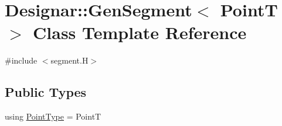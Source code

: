 \hypertarget{class_designar_1_1_gen_segment}{}\section{Designar\+:\+:Gen\+Segment$<$ PointT $>$ Class Template Reference}
\label{class_designar_1_1_gen_segment}


{\ttfamily \#include $<$segment.\+H$>$}

\subsection*{Public Types}
\begin{DoxyCompactItemize}
\item 
using \hyperlink{class_designar_1_1_gen_segment_a411a0e6d28251be878c23ad4dbec71bb}{Point\+Type} = PointT
\end{DoxyCompactItemize}
